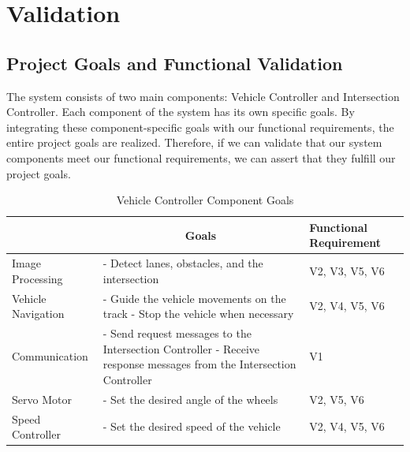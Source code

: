 \documentclass [10pt]{article}
\begin{document}
\section {Validation}

\subsection{Project Goals and Functional Validation}
The system consists of two main components: Vehicle Controller and Intersection Controller. Each component of the system has its own specific goals. By integrating these component-specific goals with our functional requirements, the entire project goals are realized. Therefore, if we can validate that our system components meet our functional requirements, we can assert that they fulfill our project goals.\\



 \begin{longtable}{ |p{ }  |   p{ } | p{ } |} \caption{Vehicle Controller Component Goals}\\ \hline

     \rowcolor{subsectionC}
     \multicolumn{1}{|c|}{\textbf{Component Name}} &
     \multicolumn{1}{c|}{\textbf{Goals}} &
     \textbf{Functional Requirement} \\ \hline
    
    Image Processing
    & - Detect lanes, obstacles, and the intersection & V2, V3, V5, V6 \\ \hline
    
    Vehicle Navigation
    & - Guide the vehicle movements on the track \newline - Stop the vehicle when necessary & V2, V4, V5, V6  \\ \hline
    
    Communication
    & - Send request messages to the Intersection Controller \newline - Receive response messages from the Intersection Controller & V1 \\ \hline
    
    Servo Motor
    & - Set the desired angle of the wheels & V2, V5, V6   \\ \hline
    
    Speed Controller
    & - Set the desired speed of the vehicle & V2, V4, V5, V6 \\ \hline    
 \end{longtable}
\end{document}
